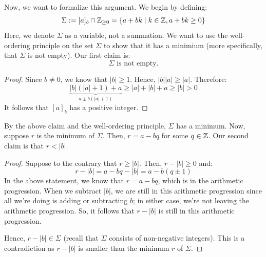 \documentclass[letterpaper]{article}
\begin{document}
Now, we want to formalize this argument. We begin by defining: 
\[\Sigma := [a]_b \cap \mathbb{Z}_{\geq 0} = \{a + bk \mid k \in \mathbb{Z}, a + bk \geq 0\}\]
Here, we denote $\Sigma$ as a variable, not a summation. We want to use the well-ordering principle on the set $\Sigma$ to show that it has a minimium (more specifically, that $\Sigma$ is not empty). Our first claim is:
\[\Sigma \text{ is not empty.}\]
\begin{mdframed}
    \begin{proof}
        Since $b \neq 0$, we know that $|b| \geq 1$. Hence, $|b||a| \geq |a|$. Therefore:
        \[\underbrace{|b|(|a| + 1) + a}_{a \pm b(|a| + 1)} \geq |a| + |b| + a \geq |b| > 0\]
        It follows that $[a]_b$ has a positive integer. 
    \end{proof}
\end{mdframed}
By the above claim and the well-ordering principle, $\Sigma$ has a minimum. Now, suppose $r$ is the minimum of $\Sigma$. Then, $r = a - bq$ for some $q \in \mathbb{Z}$. Our second claim is that $r < |b|$. 
\begin{mdframed}
    \begin{proof}
        Suppose to the contrary that $r \geq |b|$. Then, $r - |b| \geq 0$ and:
        \[r - |b| = a - bq - |b| = a - b(q \pm 1)\]
        In the above statement, we know that $r = a - bq$, which is in the arithmetic progression. When we subtract $|b|$, we are still in this arithmetic progression since all we're doing is adding or subtracting $b$; in either case, we're not leaving the arithmetic progression. So, it follows that $r - |b|$ is still in this arithmetic progression.
    
        \bigskip 
    
        Hence, $r - |b| \in \Sigma$ (recall that $\Sigma$ consists of non-negative integers). This is a contradiction as $r - |b|$ is smaller than the minimum $r$ of $\Sigma$. 
    \end{proof}
\end{mdframed}
\end{document}
